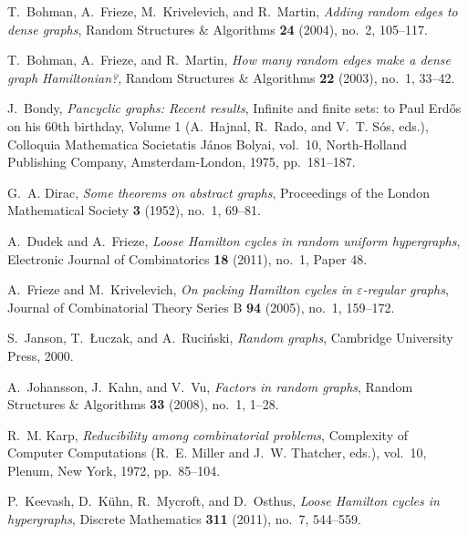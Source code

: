 \documentclass[11pt,english]{article}
\theoremstyle{plain}
\theoremstyle{definition}
\theoremstyle{definition}
\theoremstyle{plain}
\theoremstyle{plain}
\theoremstyle{plain}
\theoremstyle{plain}
\theoremstyle{remark}
\theoremstyle{remark}
\begin{document}

\providecommand{\bysame}{\leavevmode\hbox to3em{\hrulefill}\thinspace}
\providecommand{\MR}{\relax\ifhmode\unskip\space\fi MR }
\providecommand{\MRhref}[2]{%
  \href{http://www.ams.org/mathscinet-getitem?mr=#1}{#2}
}
\providecommand{\href}[2]{#2}
\begin{thebibliography}{10}

T.~Bohman, A.~Frieze, M.~Krivelevich, and R.~Martin, \emph{Adding random edges
  to dense graphs}, Random Structures \& Algorithms \textbf{24} (2004), no.~2,
  105--117.

T.~Bohman, A.~Frieze, and R.~Martin, \emph{How many random edges make a dense
  graph {H}amiltonian?}, Random Structures \& Algorithms \textbf{22} (2003),
  no.~1, 33--42.

J.~Bondy, \emph{Pancyclic graphs: Recent results}, Infinite and finite sets: to
  {P}aul {E}rd\H{o}s on his 60th birthday, Volume 1 (A.~Hajnal, R.~Rado, and
  V.~T. S\'os, eds.), Colloquia Mathematica Societatis J\'anos Bolyai, vol.~10,
  North-Holland Publishing Company, Amsterdam-London, 1975, pp.~181--187.

G.~A. Dirac, \emph{Some theorems on abstract graphs}, Proceedings of the London
  Mathematical Society \textbf{3} (1952), no.~1, 69--81.

A.~Dudek and A.~Frieze, \emph{Loose {H}amilton cycles in random uniform
  hypergraphs}, Electronic Journal of Combinatorics \textbf{18} (2011), no.~1,
  Paper 48.

A.~Frieze and M.~Krivelevich, \emph{On packing {H}amilton cycles in
  $\varepsilon$-regular graphs}, Journal of Combinatorial Theory Series B
  \textbf{94} (2005), no.~1, 159--172.

S.~Janson, T.~{\L{}}uczak, and A.~Ruci{\'n}ski, \emph{Random graphs}, Cambridge
  University Press, 2000.

A.~Johansson, J.~Kahn, and V.~Vu, \emph{Factors in random graphs}, Random
  Structures \& Algorithms \textbf{33} (2008), no.~1, 1--28.

R.~M. Karp, \emph{Reducibility among combinatorial problems}, Complexity of
  Computer Computations (R.~E. Miller and J.~W. Thatcher, eds.), vol.~10,
  Plenum, New York, 1972, pp.~85--104.

P.~Keevash, D.~K{\"u}hn, R.~Mycroft, and D.~Osthus, \emph{Loose {H}amilton
  cycles in hypergraphs}, Discrete Mathematics \textbf{311} (2011), no.~7,
  544--559.


\end{thebibliography}
\end{document}
